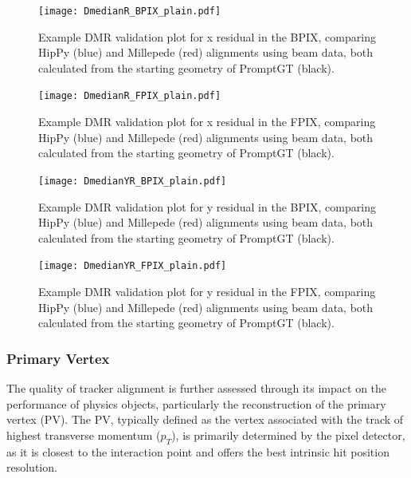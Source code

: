 \begin{figure}[!hbt]
    \begin{center}
        \texttt{[image: DmedianR\_BPIX\_plain.pdf]}
        \caption{Example DMR validation plot for x residual in the BPIX, comparing HipPy (blue) and Millepede (red) alignments using beam data, both calculated from the starting geometry of PromptGT (black).}
        \label{fig:DmedianR_BPIX_plain}
    \end{center}
\end{figure}
\begin{figure}[!hbt]
    \begin{center}
        \texttt{[image: DmedianR\_FPIX\_plain.pdf]}
        \caption{Example DMR validation plot for x residual in the FPIX, comparing HipPy (blue) and Millepede (red) alignments using beam data, both calculated from the starting geometry of PromptGT (black).}
        \label{fig:DmedianR_FPIX_plain}
    \end{center}
\end{figure}
\begin{figure}[!hbt]
    \begin{center}
        \texttt{[image: DmedianYR\_BPIX\_plain.pdf]}
        \caption{Example DMR validation plot for y residual in the BPIX, comparing HipPy (blue) and Millepede (red) alignments using beam data, both calculated from the starting geometry of PromptGT (black).}
        \label{fig:DmedianYR_BPIX_plain}
    \end{center}
\end{figure}
\begin{figure}[!hbt]
    \begin{center}
        \texttt{[image: DmedianYR\_FPIX\_plain.pdf]}
        \caption{Example DMR validation plot for y residual in the FPIX, comparing HipPy (blue) and Millepede (red) alignments using beam data, both calculated from the starting geometry of PromptGT (black).}
        \label{fig:DmedianYR_FPIX_plain}
    \end{center}
\end{figure}

\subsubsection{Primary Vertex}

The quality of tracker alignment is further assessed through its impact on the performance of physics objects, particularly the reconstruction of the primary vertex (PV). The PV, typically defined as the vertex associated with the track of highest transverse momentum (\( p_T \)), is primarily determined by the pixel detector, as it is closest to the interaction point and offers the best intrinsic hit position resolution. 

